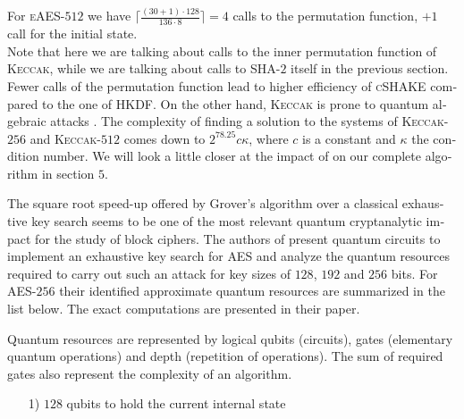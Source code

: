 \documentclass[a4paper,11pt]{article}
\begin{document}
\begin{otherlanguage}{english}
\begin{multicols}{2}
\noindent
For \textsc{eAES}-$512$ we have $\lceil\frac{(30+1)\cdot128}{136 \cdot 8}\rceil=4$ calls to the permutation function, $+ 1$ call for the initial state. \\

\noindent
Note that here we are talking about calls to the inner permutation function of \textsc{Keccak}, while we are talking about calls to \textsc{SHA}-$2$ itself in the previous section. Fewer calls of the permutation function lead to higher efficiency of \textsc{cSHAKE} compared to the one of \textsc{HKDF}. On the other hand, \textsc{Keccak} is prone to quantum algebraic attacks \cite{QAA}. The complexity of finding a solution to the systems of \textsc{Keccak}-$256$ and  \textsc{Keccak}-$512$ comes down to $2^{78.25}c\kappa$, where $c$ is a constant and $\kappa$ the condition number. We will look a little closer at the impact of \cite{QAA} on our complete algorithm in section $5$.\\



\vspace{0.1cm}

\noindent
The square root speed-up offered by Grover’s algorithm \cite{GRV} over a classical exhaustive key search seems to be one of the most relevant quantum cryptanalytic impact for the study of block ciphers. The authors of \cite{GRO} present quantum circuits to implement an exhaustive key search for \textsc{AES} and analyze the quantum resources required to carry out such an attack for key sizes of $128$, $192$ and $256$ bits. For \textsc{AES}-$256$ their identified approximate quantum resources are summarized in the list below. The exact computations are presented in their paper. \\


\noindent
Quantum resources are represented by logical qubits (circuits), gates (elementary quantum operations) and depth (repetition of operations). The sum of required gates also represent the complexity of an algorithm.\\

\begin{itemize} [noitemsep, nolistsep]

  \item[1)] $128$ qubits to hold the current internal state 
  \vspace{0.1cm}


\end{itemize}
\end{multicols}
\end{otherlanguage}
\end{document}
